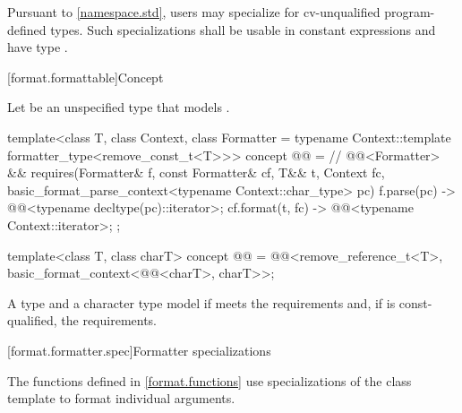 \begin{itemdescr}
\pnum
\remarks
Pursuant to \ref{namespace.std},
users may specialize  for
cv-unqualified program-defined types.
Such specializations shall be usable in constant expressions
and have type .
\end{itemdescr}

[format.formattable]{Concept }

\pnum
Let  be an unspecified type
that models
.

\begin{codeblock}
template<class T, class Context,
         class Formatter = typename Context::template formatter_type<remove_const_t<T>>>
  concept @@ =                // \expos
    @@<Formatter> &&
    requires(Formatter& f, const Formatter& cf, T&& t, Context fc,
             basic_format_parse_context<typename Context::char_type> pc)
    {
      { f.parse(pc) } -> @@<typename decltype(pc)::iterator>;
      { cf.format(t, fc) } -> @@<typename Context::iterator>;
    };

template<class T, class charT>
  concept @@ =
    @@<remove_reference_t<T>, basic_format_context<@@<charT>, charT>>;
\end{codeblock}

\pnum
A type  and a character type 
model 
if  meets
the  requirements
and, if  is const-qualified,
the  requirements.

[format.formatter.spec]{Formatter specializations}
%

\pnum
The functions defined in \ref{format.functions} use
specializations of the class template  to format
individual arguments.

